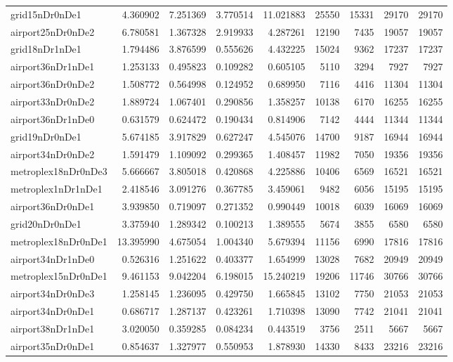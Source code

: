 \begin{longtable}{|l|r|r|r|r|r|r|r|r|}
grid15nDr0nDe1 & 4.360902 & 7.251369 & 3.770514 & 11.021883 & 25550 & 15331 & 29170 & 29170 \\
airport25nDr0nDe2 & 6.780581 & 1.367328 & 2.919933 & 4.287261 & 12190 & 7435 & 19057 & 19057 \\
grid18nDr1nDe1 & 1.794486 & 3.876599 & 0.555626 & 4.432225 & 15024 & 9362 & 17237 & 17237 \\
airport36nDr1nDe1 & 1.253133 & 0.495823 & 0.109282 & 0.605105 & 5110 & 3294 & 7927 & 7927 \\
airport36nDr0nDe2 & 1.508772 & 0.564998 & 0.124952 & 0.689950 & 7116 & 4416 & 11304 & 11304 \\
airport33nDr0nDe2 & 1.889724 & 1.067401 & 0.290856 & 1.358257 & 10138 & 6170 & 16255 & 16255 \\
airport36nDr1nDe0 & 0.631579 & 0.624472 & 0.190434 & 0.814906 & 7142 & 4444 & 11344 & 11344 \\
grid19nDr0nDe1 & 5.674185 & 3.917829 & 0.627247 & 4.545076 & 14700 & 9187 & 16944 & 16944 \\
airport34nDr0nDe2 & 1.591479 & 1.109092 & 0.299365 & 1.408457 & 11982 & 7050 & 19356 & 19356 \\
metroplex18nDr0nDe3 & 5.666667 & 3.805018 & 0.420868 & 4.225886 & 10406 & 6569 & 16521 & 16521 \\
metroplex1nDr1nDe1 & 2.418546 & 3.091276 & 0.367785 & 3.459061 & 9482 & 6056 & 15195 & 15195 \\
airport36nDr0nDe1 & 3.939850 & 0.719097 & 0.271352 & 0.990449 & 10018 & 6039 & 16069 & 16069 \\
grid20nDr0nDe1 & 3.375940 & 1.289342 & 0.100213 & 1.389555 & 5674 & 3855 & 6580 & 6580 \\
metroplex18nDr0nDe1 & 13.395990 & 4.675054 & 1.004340 & 5.679394 & 11156 & 6990 & 17816 & 17816 \\
airport34nDr1nDe0 & 0.526316 & 1.251622 & 0.403377 & 1.654999 & 13028 & 7682 & 20949 & 20949 \\
metroplex15nDr0nDe1 & 9.461153 & 9.042204 & 6.198015 & 15.240219 & 19206 & 11746 & 30766 & 30766 \\
airport34nDr0nDe3 & 1.258145 & 1.236095 & 0.429750 & 1.665845 & 13102 & 7750 & 21053 & 21053 \\
airport34nDr0nDe1 & 0.686717 & 1.287137 & 0.423261 & 1.710398 & 13090 & 7742 & 21041 & 21041 \\
airport38nDr1nDe1 & 3.020050 & 0.359285 & 0.084234 & 0.443519 & 3756 & 2511 & 5667 & 5667 \\
airport35nDr0nDe1 & 0.854637 & 1.327977 & 0.550953 & 1.878930 & 14330 & 8433 & 23216 & 23216 \\

\end{longtable}
